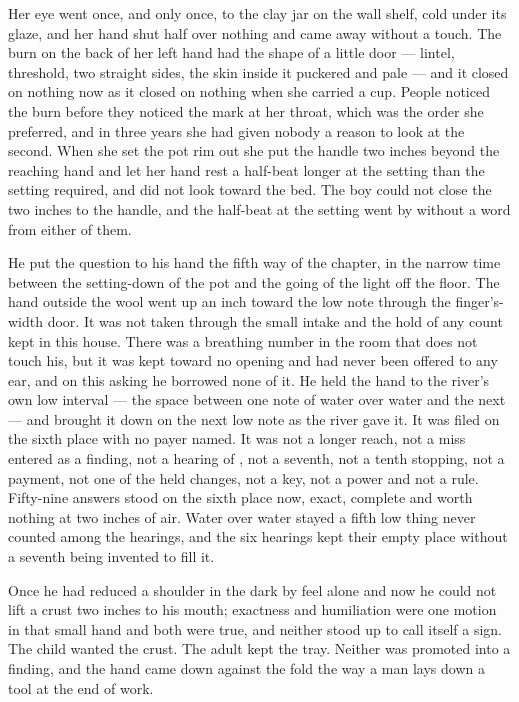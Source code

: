 Her eye went once, and only once, to the clay jar on the wall shelf, cold under its glaze, and her hand shut half over nothing and came away without a touch. The burn on the back of her left hand had the shape of a little door --- lintel, threshold, two straight sides, the skin inside it puckered and pale --- and it closed on nothing now as it closed on nothing when she carried a cup. People noticed the burn before they noticed the mark at her throat, which was the order she preferred, and in three years she had given nobody a reason to look at the second. When she set the pot rim out she put the handle two inches beyond the reaching hand and let her hand rest a half-beat longer at the setting than the setting required, and did not look toward the bed. The boy could not close the two inches to the handle, and the half-beat at the setting went by without a word from either of them.

\scenebreak

He put the question to his hand the fifth way of the chapter, in the narrow time between the setting-down of the pot and the going of the light off the floor. The hand outside the wool went up an inch toward the low note through the finger's-width door. It was not taken through the small intake and the hold of any count kept in this house. There was a breathing number in the room that does not touch his, but it was kept toward no opening and had never been offered to any ear, and on this asking he borrowed none of it. He held the hand to the river's own low interval --- the space between one note of water over water and the next --- and brought it down on the next low note as the river gave it. It was filed on the sixth place with no payer named. It was not a longer reach, not a miss entered as a finding, not a hearing of , not a seventh, not a tenth stopping, not a payment, not one of the held changes, not a key, not a power and not a rule. Fifty-nine answers stood on the sixth place now, exact, complete and worth nothing at two inches of air. Water over water stayed a fifth low thing never counted among the hearings, and the six hearings kept their empty place without a seventh being invented to fill it.

Once he had reduced a shoulder in the dark by feel alone and now he could not lift a crust two inches to his mouth; exactness and humiliation were one motion in that small hand and both were true, and neither stood up to call itself a sign. The child wanted the crust. The adult kept the tray. Neither was promoted into a finding, and the hand came down against the fold the way a man lays down a tool at the end of work.

